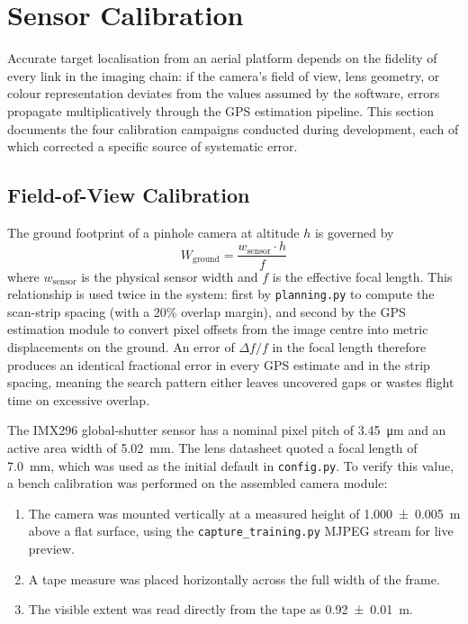 \section{Sensor Calibration}\label{sec:calibration}

Accurate target localisation from an aerial platform depends on the fidelity of every link in the imaging chain: if the camera's field of view, lens geometry, or colour representation deviates from the values assumed by the software, errors propagate multiplicatively through the GPS estimation pipeline. This section documents the four calibration campaigns conducted during development, each of which corrected a specific source of systematic error.

\subsection{Field-of-View Calibration}\label{sec:cal:fov}

The ground footprint of a pinhole camera at altitude $h$ is governed by
\begin{equation}\label{eq:footprint-calib}
    W_{\text{ground}} = \frac{w_{\text{sensor}} \cdot h}{f}
\end{equation}
where $w_{\text{sensor}}$ is the physical sensor width and $f$ is the effective focal length. This relationship is used twice in the system: first by \texttt{planning.py} to compute the scan-strip spacing (with a 20\% overlap margin), and second by the GPS estimation module to convert pixel offsets from the image centre into metric displacements on the ground. An error of $\Delta f / f$ in the focal length therefore produces an identical fractional error in every GPS estimate and in the strip spacing, meaning the search pattern either leaves uncovered gaps or wastes flight time on excessive overlap.

The IMX296 global-shutter sensor has a nominal pixel pitch of \SI{3.45}{\micro\metre} and an active area width of \SI{5.02}{\milli\metre}. The lens datasheet quoted a focal length of \SI{7.0}{\milli\metre}, which was used as the initial default in \texttt{config.py}. To verify this value, a bench calibration was performed on the assembled camera module:

\begin{enumerate}
    \item The camera was mounted vertically at a measured height of \SI{1.000 \pm 0.005}{\metre} above a flat surface, using the \texttt{capture\_training.py} MJPEG stream for live preview.
    \item A tape measure was placed horizontally across the full width of the frame.
    \item The visible extent was read directly from the tape as \SI{0.92 \pm 0.01}{\metre}.
\end{enumerate}


